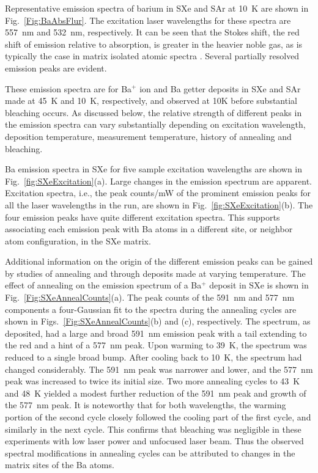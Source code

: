 \documentclass[aps,pra,reprint,superscriptaddress]{revtex4-1}
\begin{document}
Representative emission spectra of barium in SXe and SAr at 10~K are shown in Fig.~\ref{Fig:BaAbsFlur}. 
The excitation laser wavelengths for these spectra are 557~nm and 532~nm, respectively.
It can be seen that the Stokes shift, the red shift of emission relative to absorption, is greater in the heavier noble gas, as is typically the case in matrix isolated atomic spectra \cite{Crepin1999}. 
Several partially resolved emission peaks are evident.

These emission spectra are for Ba$^+$ ion and Ba getter deposits in SXe and SAr made at 45~K and 10~K, respectively, and observed at 10K before substantial bleaching occurs. 
As discussed below, the relative strength of different peaks in the emission spectra can vary substantially depending on excitation wavelength, deposition temperature, measurement temperature, history of annealing and bleaching.  

Ba emission spectra in SXe for five sample excitation wavelengths are shown in Fig.~\ref{fig:SXeExcitation}(a).
Large changes in the emission spectrum are apparent.
Excitation spectra, i.e., the peak counts/mW of the prominent emission peaks for all the laser wavelengths in the run, are shown in Fig.~\ref{fig:SXeExcitation}(b).  
The four emission peaks have quite different excitation spectra.
This supports associating each emission peak with Ba atoms in a different site, or neighbor atom configuration, in the SXe matrix.



Additional information on the origin of the different emission peaks can be gained by studies of annealing and through deposits made at varying temperature. 
The effect of annealing on the emission spectrum of a Ba$^+$ deposit in SXe is shown in Fig.~\ref{Fig:SXeAnnealCounts}(a). 
The peak counts of the 591~nm and 577~nm components a four-Gaussian fit to the spectra during the annealing cycles are shown in Figs.~\ref{Fig:SXeAnnealCounts}(b) and (c), respectively.
The spectrum, as deposited, had a large and broad 591~nm emission peak with a tail extending to the red and a hint of a 577~nm peak.
Upon warming to 39~K, the spectrum was reduced to a single broad bump.
After cooling back to 10~K, the spectrum had changed considerably.
The 591~nm peak was narrower and lower, and the 577~nm peak was increased to twice its initial size.
Two more annealing cycles to 43~K and 48~K yielded a modest further reduction of the 591~nm peak and growth of the 577~nm peak.
It is noteworthy that for both wavelengths, the warming portion of the second cycle closely followed the cooling part of the first cycle, and similarly in the next cycle.
This confirms that bleaching was negligible in these experiments with low laser power and unfocused laser beam. 
Thus the observed spectral modifications in annealing cycles can be attributed to changes in the matrix sites of the Ba atoms.
 
\end{document}
